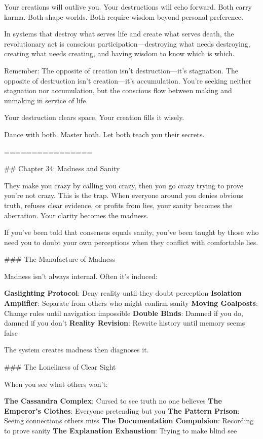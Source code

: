 \documentclass[12pt]{book}
\begin{document}
Your creations will outlive you. Your destructions will echo forward. Both carry karma. Both shape worlds. Both require wisdom beyond personal preference.

In systems that destroy what serves life and create what serves death, the revolutionary act is conscious participation—destroying what needs destroying, creating what needs creating, and having wisdom to know which is which.

Remember: The opposite of creation isn't destruction—it's stagnation. The opposite of destruction isn't creation—it's accumulation. You're seeking neither stagnation nor accumulation, but the conscious flow between making and unmaking in service of life.

Your destruction clears space. Your creation fills it wisely.

Dance with both. Master both. Let both teach you their secrets.

================

\#\# Chapter 34: Madness and Sanity

They make you crazy by calling you crazy, then you go crazy trying to prove you're not crazy. This is the trap. When everyone around you denies obvious truth, refuses clear evidence, or profits from lies, your sanity becomes the aberration. Your clarity becomes the madness.

If you've been told that consensus equals sanity, you've been taught by those who need you to doubt your own perceptions when they conflict with comfortable lies.

\#\#\# The Manufacture of Madness

Madness isn't always internal. Often it's induced:

\textbf{Gaslighting Protocol}: Deny reality until they doubt perception
\textbf{Isolation Amplifier}: Separate from others who might confirm sanity
\textbf{Moving Goalposts}: Change rules until navigation impossible
\textbf{Double Binds}: Damned if you do, damned if you don't
\textbf{Reality Revision}: Rewrite history until memory seems false

The system creates madness then diagnoses it.

\#\#\# The Loneliness of Clear Sight

When you see what others won't:

\textbf{The Cassandra Complex}: Cursed to see truth no one believes
\textbf{The Emperor's Clothes}: Everyone pretending but you
\textbf{The Pattern Prison}: Seeing connections others miss
\textbf{The Documentation Compulsion}: Recording to prove sanity
\textbf{The Explanation Exhaustion}: Trying to make blind see
\end{document}
